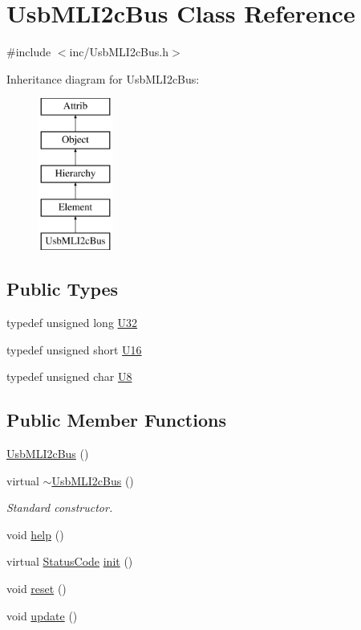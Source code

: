 \hypertarget{classUsbMLI2cBus}{}\section{Usb\+M\+L\+I2c\+Bus Class Reference}
\label{classUsbMLI2cBus}


{\ttfamily \#include $<$inc/\+Usb\+M\+L\+I2c\+Bus.\+h$>$}

Inheritance diagram for Usb\+M\+L\+I2c\+Bus\+:\begin{figure}[H]
\begin{center}
\leavevmode
\includegraphics[height=5.000000cm]{classUsbMLI2cBus}
\end{center}
\end{figure}
\subsection*{Public Types}
\begin{DoxyCompactItemize}
\item 
typedef unsigned long \hyperlink{classUsbMLI2cBus_a27c83a30911e97fca2756efaf382c513}{U32}
\item 
typedef unsigned short \hyperlink{classUsbMLI2cBus_a0b984fbce2470afccf2e1bc4ffd96da7}{U16}
\item 
typedef unsigned char \hyperlink{classUsbMLI2cBus_a004c20fbfe08e01759f9f90806cb931e}{U8}
\end{DoxyCompactItemize}
\subsection*{Public Member Functions}
\begin{DoxyCompactItemize}
\item 
\hyperlink{classUsbMLI2cBus_a52646a22854d42a44810c5a976d08895}{Usb\+M\+L\+I2c\+Bus} ()
\item 
virtual \hyperlink{classUsbMLI2cBus_a4c6a7984e2401b48b3da785affc4d8be}{$\sim$\+Usb\+M\+L\+I2c\+Bus} ()
\begin{DoxyCompactList}\small\item\em Standard constructor. \end{DoxyCompactList}\item 
void \hyperlink{classUsbMLI2cBus_aeb2b5e4169c6847942ae89e5bf476c79}{help} ()
\item 
virtual \hyperlink{classStatusCode}{Status\+Code} \hyperlink{classUsbMLI2cBus_ad212b393510dbc3ca5b13981e1cdc0b3}{init} ()
\item 
void \hyperlink{classUsbMLI2cBus_a70751407b58ccf17db3940daeeb9bb19}{reset} ()
\item 
void \hyperlink{classUsbMLI2cBus_a6a9d70c1f0948b35c55689065ce97b55}{update} ()
\end{DoxyCompactItemize}
